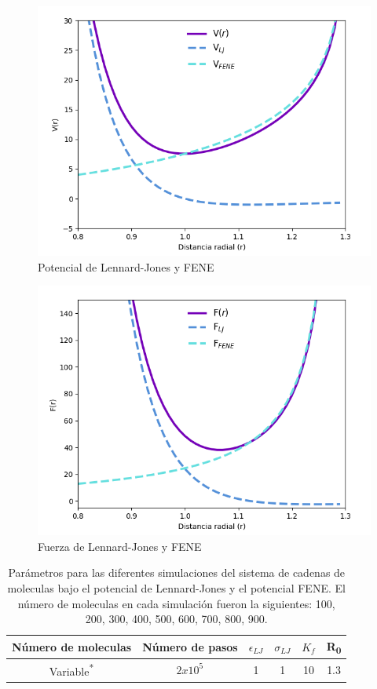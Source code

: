 \begin{figure}[H]
    \centering
    \includegraphics[scale=0.42]{../Graphics/potential.png}
    \caption{Potencial de Lennard-Jones y FENE}
    \label{fig:pot-len-jones}
\end{figure}
\begin{figure}[H]
    \centering
    \includegraphics[scale=0.42]{../Graphics/force.png}
    \caption{Fuerza de Lennard-Jones y FENE}
    \label{fig:force-len-jones}
\end{figure}
\begin{table}
    \centering
    \begin{tabular}{cccccc}
        \hline
        Número de moleculas & Número de pasos &$\epsilon_{LJ}$ & $\sigma_{LJ} $ & $K_f$  & R\textsubscript{0} \\ \hline
        \multirow{2}{*}{Variable\textsuperscript{*}} & \multirow{2}{*}{$2x10^{5}$}&\multirow{2}{*}{1} &\multirow{2}{*}{1}  &\multirow{2}{*}{10}   & \multirow{2}{*}{1.3}\\
          & & & & & \\ \hline
    \end{tabular}
    \caption{Parámetros para las diferentes simulaciones del sistema de cadenas de moleculas bajo el potencial de Lennard-Jones y el potencial FENE. El número de moleculas en cada simulación fueron la siguientes: 100, 200, 300, 400, 500, 600, 700, 800, 900.}
    \label{table:parametros}
\end{table}
